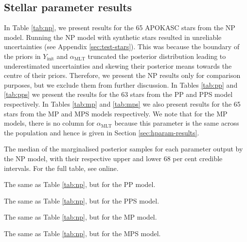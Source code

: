 \documentclass[a4paper,fleqn,usenatbib]{mnras}
\newcommand{\mlt}{\ensuremath{{\alpha_\mathrm{MLT}}}}
\begin{document}
\subsection{Stellar parameter results}\label{sec:param-results}

In Table \ref{tab:np}, we present results for the 65 APOKASC stars from the NP model. Running the NP model with synthetic stars resulted in unreliable uncertainties (see Appendix \ref{sec:test-stars}). This was because the boundary of the priors in $Y_\mathrm{init}$ and $\mlt$ truncated the posterior distribution leading to underestimated uncertainties and skewing their posterior means towards the centre of their priors. Therefore, we present the NP results only for comparison purposes, but we exclude them from further discussion. In Tables \ref{tab:pp} and \ref{tab:pps} we present the results for the 63 stars from the PP and PPS model respectively. In Tables \ref{tab:mp} and \ref{tab:mps} we also present results for the 65 stars from the MP and MPS models respectively. We note that for the MP models, there is no column for $\mlt$ because this parameter is the same across the population and hence is given in Section \ref{sec:hparam-results}.

\begin{table}
	\centering
	\caption{The median of the marginalised posterior samples for each parameter output by the NP model, with their respective upper and lower 68 per cent credible intervals. For the full table, see online.}
	\label{tab:np}
	
\end{table}

\begin{table}
	\centering
	\caption{The same as Table \ref{tab:np}, but for the PP model.}
	\label{tab:pp}
	
\end{table}

\begin{table}
	\centering
	\caption{The same as Table \ref{tab:np}, but for the PPS model.}
	\label{tab:pps}
	
\end{table}

\begin{table}
	\centering
	\caption{The same as Table \ref{tab:np}, but for the MP model.}
	\label{tab:mp}
	
\end{table}

\begin{table}
	\centering
	\caption{The same as Table \ref{tab:np}, but for the MPS model.}
	\label{tab:mps}
	
\end{table}
\end{document}
